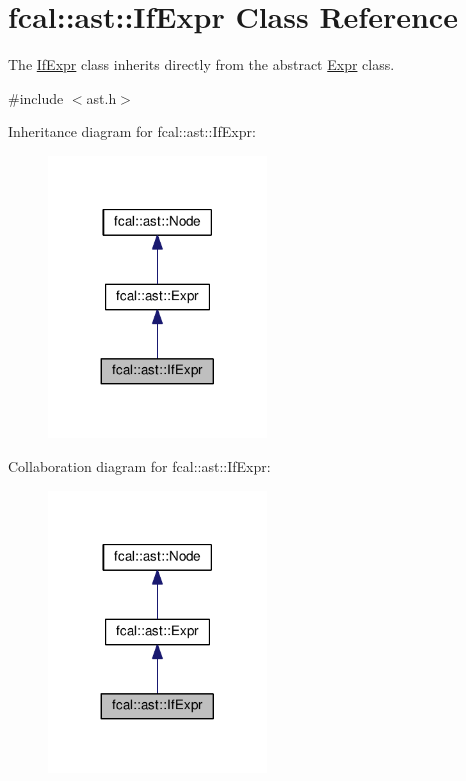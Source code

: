 \hypertarget{classfcal_1_1ast_1_1IfExpr}{}\section{fcal\+:\+:ast\+:\+:If\+Expr Class Reference}
\label{classfcal_1_1ast_1_1IfExpr}


The \hyperlink{classfcal_1_1ast_1_1IfExpr}{If\+Expr} class inherits directly from the abstract \hyperlink{classfcal_1_1ast_1_1Expr}{Expr} class.  




{\ttfamily \#include $<$ast.\+h$>$}



Inheritance diagram for fcal\+:\+:ast\+:\+:If\+Expr\+:
\nopagebreak
\begin{figure}[H]
\begin{center}
\leavevmode
\includegraphics[width=164pt]{classfcal_1_1ast_1_1IfExpr__inherit__graph}
\end{center}
\end{figure}


Collaboration diagram for fcal\+:\+:ast\+:\+:If\+Expr\+:
\nopagebreak
\begin{figure}[H]
\begin{center}
\leavevmode
\includegraphics[width=164pt]{classfcal_1_1ast_1_1IfExpr__coll__graph}
\end{center}
\end{figure}
